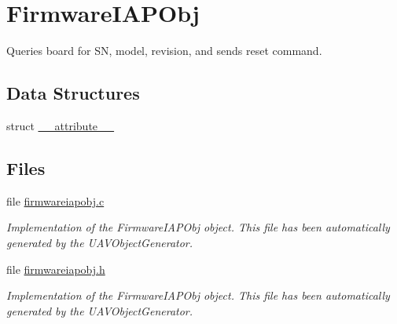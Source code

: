 \hypertarget{group___firmware_i_a_p_obj}{\section{\-Firmware\-I\-A\-P\-Obj}
\label{group___firmware_i_a_p_obj}
}


\-Queries board for \-S\-N, model, revision, and sends reset command.  


\subsection*{\-Data \-Structures}
\begin{DoxyCompactItemize}
\item 
struct \hyperlink{struct____attribute____}{\-\_\-\-\_\-attribute\-\_\-\-\_\-}
\end{DoxyCompactItemize}
\subsection*{\-Files}
\begin{DoxyCompactItemize}
\item 
file \hyperlink{firmwareiapobj_8c}{firmwareiapobj.\-c}
\begin{DoxyCompactList}\small\item\em \-Implementation of the \-Firmware\-I\-A\-P\-Obj object. \-This file has been automatically generated by the \-U\-A\-V\-Object\-Generator. \end{DoxyCompactList}\item 
file \hyperlink{firmwareiapobj_8h}{firmwareiapobj.\-h}
\begin{DoxyCompactList}\small\item\em \-Implementation of the \-Firmware\-I\-A\-P\-Obj object. \-This file has been automatically generated by the \-U\-A\-V\-Object\-Generator. \end{DoxyCompactList}\end{DoxyCompactItemize}

